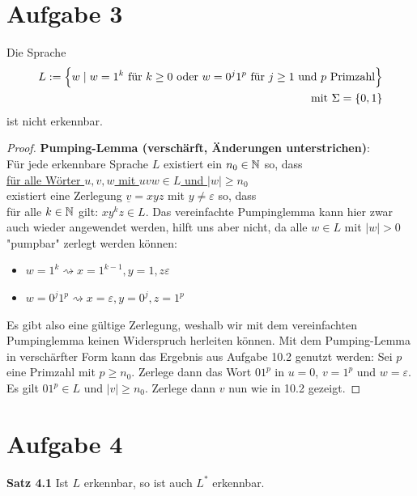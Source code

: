 \documentclass[12pt,a4paper]{article}
\begin{document}
\section*{Aufgabe 3}
Die Sprache
\begin{align*}
	L:=\Big\lbrace w\mid w=1^k\text{ für }k\geq0\text{ oder }w=0^j1^p\text{ für }j\geq1\text{ und }p\text{ Primzahl}\Big\rbrace\\
	\mit\Sigma=\lbrace0,1\rbrace
\end{align*}
ist nicht erkennbar.

\begin{proof}
	\textbf{Pumping-Lemma (verschärft, Änderungen unterstrichen)}:\\
	Für jede erkennbare Sprache $L$ existiert ein $n_0\in\N$ so, dass\\
	\underline{für alle Wörter $u,v,w$ mit $uvw\in L$ und $|w|\geq n_0$}\\
	existiert eine Zerlegung $\underline{v}=xyz$ mit $y\neq\varepsilon$ so, dass\\
	für alle $k\in\N$ gilt: $xy^kz\in L$.\nl
	Das vereinfachte Pumpinglemma kann hier zwar auch wieder angewendet werden, hilft uns aber nicht, da
	alle $w\in L$ mit $|w|>0$ "pumpbar" zerlegt werden können:
	\begin{itemize}
		\item $w=1^k\rightsquigarrow x=1^{k-1},y=1,z\varepsilon$
		\item $w=0^j 1^p\rightsquigarrow x=\varepsilon,y=0^j,z=1^p$
	\end{itemize}
	Es gibt also eine gültige Zerlegung, weshalb wir mit dem vereinfachten Pumpinglemma keinen Widerspruch herleiten können.
	Mit dem Pumping-Lemma in verschärfter Form kann das Ergebnis aus Aufgabe 10.2 genutzt werden:
	Sei $p$ eine Primzahl mit $p\geq n_0$. Zerlege dann das Wort $01^p$ in $u=0$, $v=1^p$ und $w=\varepsilon$.
	Es gilt $01^p\in L$ und $|v|\geq n_0$.
	Zerlege dann $v$ nun wie in 10.2 gezeigt.
\end{proof}

\section*{Aufgabe 4}
\textbf{Satz 4.1} Ist $L$ erkennbar, so ist auch $L^\ast$ erkennbar.
\end{document}
